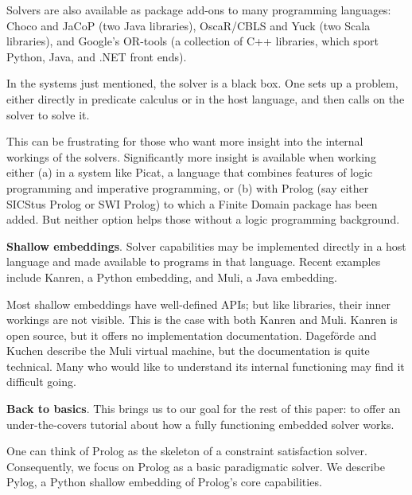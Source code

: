 Solvers are also available as package add-ons to many programming languages: Choco\cite{prud2019choco} and JaCoP\cite{kuchcinski2013jacop} (two Java libraries), OscaR/CBLS\cite{Oscar} and Yuck\cite{Yuck} (two Scala libraries), and Google's OR-tools\cite{Google-OR-tools} (a collection of C++ libraries, which sport Python, Java, and .NET front ends).

In the systems just mentioned, the solver is a black box. One sets up a problem, either directly in predicate calculus or in the host language, and then calls on the solver to solve it. 

This can be frustrating for those who want more insight into the internal workings of the solvers. Significantly more insight is available when working either (a) in a system like Picat\cite{zhou2015constraint}, a language that combines features of logic programming and imperative programming, or (b) with Prolog (say either SICStus Prolog\cite{carlsson2014sicstus} or SWI Prolog\cite{swi-prolog}) to which a Finite Domain package has been added. But neither option helps those without a logic programming background. 

\smallv\noindent\textbf{Shallow embeddings}.  Solver capabilities may be implemented directly in a host language and made available to programs in that language.\cite{hoare1998unifying, gibbons2014folding} Recent examples include Kanren\cite{Rocklin2019}, a Python embedding, and Muli\cite{dageforde2018constraint}, a Java embedding.

Most shallow embeddings have well-defined APIs; but like libraries, their inner workings are not visible. This is the case with both Kanren and Muli. Kanren is open source, but it offers no implementation documentation. Dagef{\"o}rde and Kuchen describe the Muli virtual machine\cite{dageforde2019compiler}, but the documentation is quite technical. Many who would like to understand its internal functioning may find it difficult going. 

\smallv\noindent\textbf{Back to basics}. This brings us to our goal for the rest of this paper: to offer an under-the-covers tutorial about how a fully functioning embedded solver works. 

One can think of Prolog as the skeleton of a constraint satisfaction solver. Consequently, we focus on Prolog as a basic paradigmatic solver. We describe Pylog, a Python shallow embedding of Prolog's core capabilities. 

